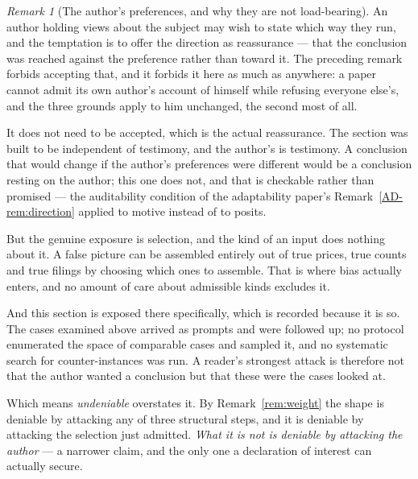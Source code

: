 \documentclass[11pt,a4paper]{article}
\theoremstyle{remark}
\newtheorem{remark}[definition]{Remark}
\begin{document}
\begin{remark}[The author's preferences, and why they are not load-bearing]\label{rem:bias}
An author holding views about the subject may wish to state which way they run, and the temptation is to
offer the direction as reassurance --- that the conclusion was reached against the preference rather
than toward it. The preceding remark forbids accepting that, and it forbids it here as much as
anywhere: a paper cannot admit its own author's account of himself while refusing everyone else's, and
the three grounds apply to him unchanged, the second most of all.

It does not need to be accepted, which is the actual reassurance. The section was built to be
independent of testimony, and the author's is testimony. A conclusion that would change if the
author's preferences were different would be a conclusion resting on the author; this one does not, and
that is checkable rather than promised --- the auditability condition of the adaptability paper's Remark~\ref{AD-rem:direction} applied to motive
instead of to posits.

But the genuine exposure is selection, and the kind of an input does nothing about it. A false
picture can be assembled entirely out of true prices, true counts and true filings by choosing which
ones to assemble. That is where bias actually enters, and no amount of care about admissible
kinds excludes it.

And this section is exposed there specifically, which is recorded because it is so. The cases
examined above arrived as prompts and were followed up; no protocol enumerated the space of
comparable cases and sampled it, and no systematic search for counter-instances was run. A reader's
strongest attack is therefore not that the author wanted a conclusion but that these were the cases
looked at.

Which means \emph{undeniable} overstates it. By Remark~\ref{rem:weight} the shape is deniable by
attacking any of three structural steps, and it is deniable by attacking the selection just admitted.
\emph{What it is not is deniable by attacking the author} --- a narrower claim, and the only one a
declaration of interest can actually secure.
\end{remark}
\end{document}
